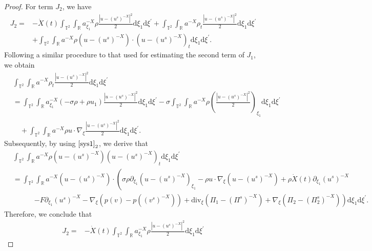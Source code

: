 \documentclass[10pt,reqno]{amsart}
\numberwithin{equation}{section}
\newcommand{\dif}{\mathrm{d}}
\newcommand{\ddiv}{\mathrm{div}}
\begin{document}
\begin{proof}
For term $J_2$, we have
\begin{align*}
J_2
=&-\dot{X}(t)\int_{\mathbb{T}^2}\int_{\mathbb{R}}a^{-X}_{\xi_1}\rho \frac{|u-(u^s)^{-X}|^2}{2}\dif \xi_1\dif \xi^{\prime}
+\int_{\mathbb{T}^2}\int_{\mathbb{R}}a^{-X}\rho_t \frac{|u-(u^s)^{-X}|^2}{2}\dif \xi_1\dif \xi^{\prime}\\
&+\int_{\mathbb{T}^2}\int_{\mathbb{R}}a^{-X}\rho
\left(u-(u^s)^{-X}\right)\cdot\left(u-(u^s)^{-X}\right)_t\dif \xi_1\dif \xi^{\prime}.
\end{align*}
Following a similar procedure to that used for estimating the second term of $J_1$, we obtain
\begin{align*}
&\int_{\mathbb{T}^2}\int_{\mathbb{R}}a^{-X}\rho_t \frac{|u-(u^s)^{-X}|^2}{2}\dif \xi_1\dif \xi^{\prime}\\
&=\int_{\mathbb{T}^2}\int_{\mathbb{R}}a^{-X}_{\xi_1}\left(-\sigma\rho+\rho u_1\right) \frac{|u-(u^s)^{-X}|^2}{2}\dif \xi_1\dif \xi^{\prime}
-\sigma\int_{\mathbb{T}^2}\int_{\mathbb{R}}a^{-X}\rho \left(\frac{|u-(u^s)^{-X}|^2}{2}\right)_{\xi_1}\dif \xi_1\dif \xi^{\prime}\\
&\quad+\int_{\mathbb{T}^2}\int_{\mathbb{R}}a^{-X}\rho u\cdot\nabla_\xi \frac{|u-(u^s)^{-X}|^2}{2}\dif \xi_1\dif \xi^{\prime}.
\end{align*}
Subsequently, by using $\eqref{sys1}_2$, we derive that
\begin{align*}
&\int_{\mathbb{T}^2}\int_{\mathbb{R}}a^{-X}\rho
\left(u-(u^s)^{-X}\right)\left(u-(u^s)^{-X}\right)_t\dif \xi_1\dif \xi^{\prime}\\
&=\int_{\mathbb{T}^2}\int_{\mathbb{R}}a^{-X}
\left(u-(u^s)^{-X}\right)\cdot
\left(\sigma\rho\partial_{\xi_1}\left(u-(u^s)^{-X}\right)_{\xi_1}
 -\rho u\cdot\nabla_\xi\left(u-(u^s)^{-X}\right)+\rho\dot{X}(t)\partial_{\xi_1}(u^s)^{-X} \right.\\
        &\qquad\quad\left.-F\partial_{\xi_1}(u^s)^{-X}-\nabla_\xi\left(p(v)-p((v^s)^{-X})\right)
        +\ddiv_\xi\left(\Pi_1-(\Pi^s)^{-X}\right)+\nabla_\xi\left(\Pi_2-(\Pi_2^s)^{-X}\right)\right)\dif \xi_1\dif \xi^{\prime}.
\end{align*}
Therefore, we conclude that
\begin{equation}\label{0j2}
\begin{aligned}
J_2=&-\dot{X}(t)\int_{\mathbb{T}^2}\int_{\mathbb{R}}a^{-X}_{\xi_1}\rho \frac{|u-(u^s)^{-X}|^2}{2}\dif \xi_1\dif \xi^{\prime}

\end{aligned}
\end{equation}
\end{proof}
\end{document}
